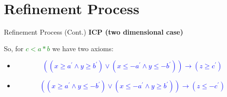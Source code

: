 \documentclass[]{beamer}
\begin{document}
\section{Refinement Process}
\begin{frame}{Refinement Process (Cont.)}
    \textbf{ICP (two dimensional case)}\newline
    
    So, for \textcolor{green}{$c < a \ast b$} we have two axioms:
    \bigskip
    \bigskip
    \begin{itemize}
        \item \textcolor{blue}{$$((x \geq a^\prime \wedge y \geq b^\prime) \vee (x \leq -a^\prime \wedge y \leq -b^\prime)) \rightarrow (z \geq c^\prime)$$}
        \item \textcolor{blue}{$$((x \geq a^\prime \wedge y \leq -b^\prime) \vee (x \leq -a^\prime \wedge y \geq b^\prime)) \rightarrow (z \leq -c^\prime)$$}
    \end{itemize}
\end{frame}

\end{document}
